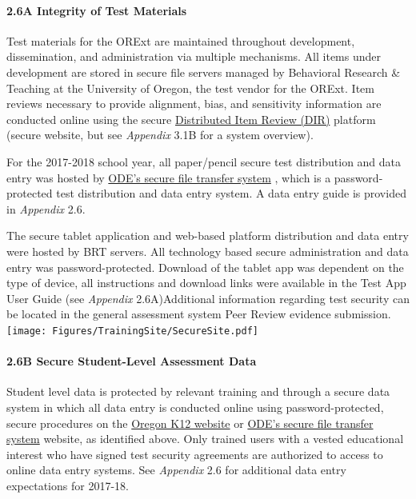 \documentclass[]{article}
\let\oldparagraph\paragraph
\renewcommand{\paragraph}[1]{\oldparagraph{#1}\mbox{}}
\begin{document}
\hypertarget{a-integrity-of-test-materials}{%
\paragraph{2.6A Integrity of Test
Materials}\label{a-integrity-of-test-materials}}

Test materials for the ORExt are maintained throughout development,
dissemination, and administration via multiple mechanisms. All items
under development are stored in secure file servers managed by
Behavioral Research \& Teaching at the University of Oregon, the test
vendor for the ORExt. Item reviews necessary to provide alignment, bias,
and sensitivity information are conducted online using the secure
\color{link}\href{http://brtitemreview.com}{Distributed Item Review
(DIR)}\color{black} platform (secure website, but see \emph{Appendix}
3.1B for a system overview).

For the 2017-2018 school year, all paper/pencil secure test distribution
and data entry was hosted by
\color{link}\href{https://district.ode.state.or.us/apps/login/}{ODE's
secure file transfer system} \color {black}, which is a
password-protected test distribution and data entry system. A data entry
guide is provided in \emph{Appendix} 2.6.

The secure tablet application and web-based platform distribution and
data entry were hosted by BRT servers. All technology based secure
administration and data entry was password-protected. Download of the
tablet app was dependent on the type of device, all instructions and
download links were available in the Test App User Guide (see
\emph{Appendix} 2.6A)Additional information regarding test security can
be located in the general assessment system Peer Review evidence
submission. \FloatBarrier
\texttt{[image: Figures/TrainingSite/SecureSite.pdf]}

\hypertarget{b-secure-student-level-assessment-data}{%
\paragraph{2.6B Secure Student-Level Assessment
Data}\label{b-secure-student-level-assessment-data}}

Student level data is protected by relevant training and through a
secure data system in which all data entry is conducted online using
password-protected, secure procedures on the \color{link}
\href{https://or.k12test.com}{Oregon K12 website} \color{black} or
\color{link} \href{https://district.ode.state.or.us/apps/login/}{ODE's
secure file transfer system} \color{black} website, as identified above.
Only trained users with a vested educational interest who have signed
test security agreements are authorized to access to online data entry
systems. See \emph{Appendix} 2.6 for additional data entry expectations
for 2017-18.
\end{document}
